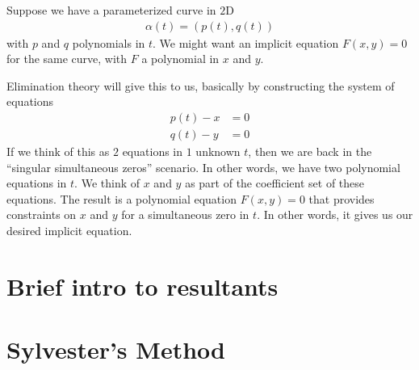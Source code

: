 
Suppose we have a parameterized curve in $2$D
\begin{align*}
  \alpha(t) = (p(t), q(t))
\end{align*}
with $p$ and $q$ polynomials in $t$. We might want an implicit
equation $F(x, y) = 0$ for the same curve, with $F$ a polynomial in
$x$ and $y$.

Elimination theory will give this to us, basically by constructing the
system of equations
\begin{align*}
  p(t) - x &= 0 \\
  q(t) - y &= 0
\end{align*}
If we think of this as $2$ equations in $1$ unknown $t$, then we are
back in the ``singular simultaneous zeros'' scenario. In other words,
we have two polynomial equations in $t$. We think of $x$ and $y$ as
part of the coefficient set of these equations. The result is a
polynomial equation $F(x, y) = 0$ that provides constraints on $x$ and
$y$ for a simultaneous zero in $t$. In other words, it gives us  our
desired implicit equation.

\section{Brief intro to resultants}

\section{Sylvester's Method}


